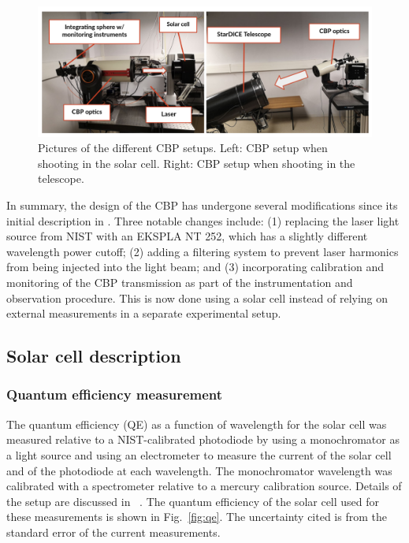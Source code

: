 \begin{figure}[ht]
\centering
\includegraphics[width=\textwidth]{fig/cbp_setup_cropped.pdf}
\caption{Pictures of the different CBP setups. Left: CBP setup when shooting in the solar cell. Right: CBP setup when shooting in the \SD telescope.}
\label{fig:cbp_setup}
\end{figure}

In summary, the design of the CBP has undergone several modifications since its initial description in \cite{Mondrik_2023}. Three notable changes include: (1) replacing the laser light source from NIST with an EKSPLA NT 252, which has a slightly different wavelength power cutoff; (2) adding a filtering system to prevent laser harmonics from being injected into the light beam; and (3) incorporating calibration and monitoring of the CBP transmission as part of the instrumentation and observation procedure. This is now done using a solar cell instead of relying on external measurements in a separate experimental setup.


\subsection{Solar cell description}

\subsubsection{Quantum efficiency measurement}
 
The quantum efficiency (QE) as a function of wavelength for the solar cell was measured relative to a NIST-calibrated photodiode by using a monochromator as a light source and using an electrometer to measure the current of the solar cell and of the photodiode at each wavelength. The monochromator wavelength was calibrated with a spectrometer relative to a mercury calibration source. Details of the setup are discussed in ~\cite{solarcell}. The quantum efficiency of the solar cell used for these measurements is shown in Fig.~\ref{fig:qe}. The uncertainty cited is from the standard error of the current measurements.

